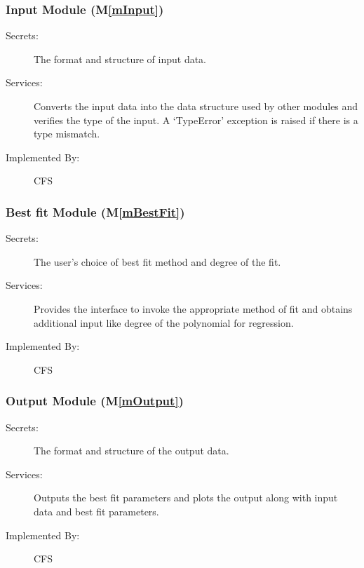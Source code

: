 \documentclass[12pt, titlepage]{article}
\newcommand{\mref}[1]{M\ref{#1}}
\newcommand{\famname}{CFS} %
\begin{document}
\subsubsection{Input Module (\mref{mInput})}

\begin{description}
	\item[Secrets:]The format and structure of input data.
	\item[Services:]Converts the input data into the data structure used by other modules and verifies the type of the input. A `TypeError' exception is raised if there is a type mismatch. 
	\item[Implemented By:] \famname{}
\end{description}

\subsubsection{Best fit Module (\mref{mBestFit})}

\begin{description}
	\item[Secrets:]The user's choice of best fit method and degree of the fit.
	\item[Services:] Provides the interface to invoke the appropriate method of fit and obtains additional input like degree of the polynomial for regression.
	\item[Implemented By:] \famname{}
\end{description}


\subsubsection{Output Module (\mref{mOutput})}

\begin{description}
	\item[Secrets:] The format and structure of the output data.
	\item[Services:] Outputs the best fit parameters and plots the output along with input data and best fit parameters.
	\item[Implemented By:] \famname{}
\end{description} 

\end{document}
